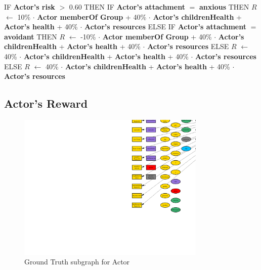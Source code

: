 \documentclass{article}%
\begin{document}
%
\begin{flushleft}%
IF %
\textbf{Actor's risk}%
$>$%
0.60%
\linebreak%
\hspace*{2em}%
THEN %
IF %
\textbf{Actor's attachment}%
$=$%
\textbf{anxious}%
\linebreak%
\hspace*{4em}%
THEN %
$R$%
$\leftarrow$%
10\%%
$\cdot$%
\textbf{Actor memberOf Group}%
+%
40\%%
$\cdot$%
\textbf{Actor's childrenHealth}%
+%
\textbf{Actor's health}%
+%
40\%%
$\cdot$%
\textbf{Actor's resources}%
\linebreak%
\hspace*{4em}%
ELSE %
IF %
\textbf{Actor's attachment}%
$=$%
\textbf{avoidant}%
\linebreak%
\hspace*{6em}%
THEN %
$R$%
$\leftarrow$%
{-}10\%%
$\cdot$%
\textbf{Actor memberOf Group}%
+%
40\%%
$\cdot$%
\textbf{Actor's childrenHealth}%
+%
\textbf{Actor's health}%
+%
40\%%
$\cdot$%
\textbf{Actor's resources}%
\linebreak%
\hspace*{6em}%
ELSE %
$R$%
$\leftarrow$%
40\%%
$\cdot$%
\textbf{Actor's childrenHealth}%
+%
\textbf{Actor's health}%
+%
40\%%
$\cdot$%
\textbf{Actor's resources}%
\linebreak%
\hspace*{2em}%
ELSE %
$R$%
$\leftarrow$%
40\%%
$\cdot$%
\textbf{Actor's childrenHealth}%
+%
\textbf{Actor's health}%
+%
40\%%
$\cdot$%
\textbf{Actor's resources}%
\end{flushleft}

%
\subsection{Actor's Reward}%
\label{subsec:Actor's Reward}%


\begin{figure}[ht]%
\centering%
\includegraphics[width=0.8\textwidth]{images/Actor.png}%
\caption{Ground Truth subgraph for Actor}%
\end{figure}
\end{document}
